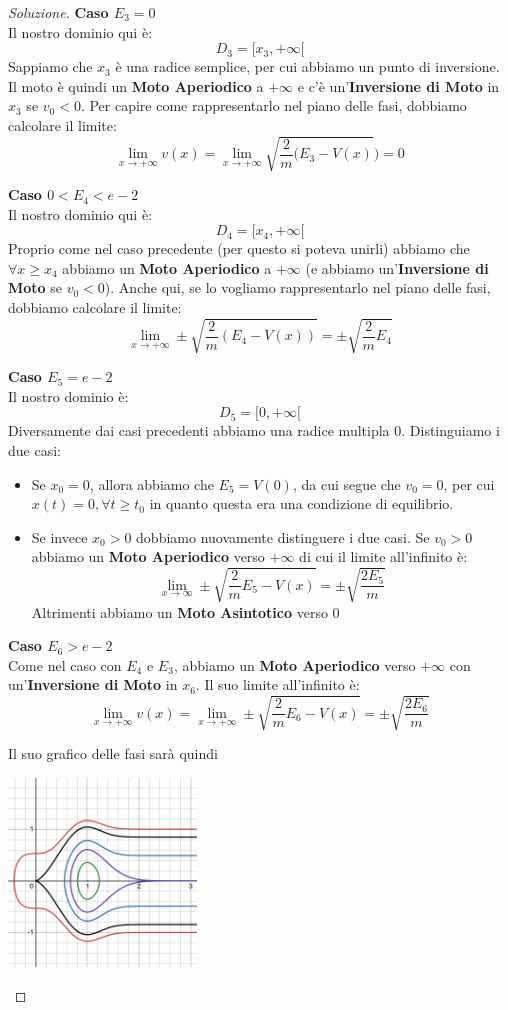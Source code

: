 \documentclass[11pt,a4paper,twoside]{article}
\theoremstyle{definition}
\newenvironment{sol}
	{\renewcommand\qedsymbol{$\blacksquare$}\begin{proof}[Soluzione]}
	{\end{proof}}
\begin{document}
\begin{sol}
	\textbf{Caso $E_3 = 0$}\\
	Il nostro dominio qui è:
	\[ D_3 = [x_3, +\infty[ \]
	Sappiamo che $x_3$ è una radice semplice, per cui abbiamo un punto di inversione. Il moto è quindi un \textbf{Moto Aperiodico} a $+\infty$ e c'è un'\textbf{Inversione di Moto} in $x_3$ se $v_0<0$. Per capire come rappresentarlo nel piano delle fasi, dobbiamo calcolare il limite:
	\[ \lim_{x \to +\infty} v(x)= \lim_{x \to +\infty} \sqrt{\frac{2}{m} (E_3 - V(x)}) = 0 \]

	\textbf{Caso $0<E_4<e-2$}\\
	Il nostro dominio qui è:
	\[ D_4 = [x_4, +\infty[ \]
	Proprio come nel caso precedente (per questo si poteva unirli) abbiamo che $\forall x\geq x_4$ abbiamo un \textbf{Moto Aperiodico} a $+\infty$ (e abbiamo un'\textbf{Inversione di Moto} se $v_0<0$). Anche qui, se lo vogliamo rappresentarlo nel piano delle fasi, dobbiamo calcolare il limite:
	\[ \lim_{x \to +\infty} \pm \sqrt{\frac 2m(E_4 - V(x))} = \pm \sqrt{\frac 2m E_4} \]

	\textbf{Caso $E_5 = e-2$}\\
	Il nostro dominio è:
	\[ D_5 = [0,+\infty[ \]
	Diversamente dai casi precedenti abbiamo una radice multipla $0$. Distinguiamo i due casi:
	\begin{itemize}
		\item Se $x_0 = 0$, allora abbiamo che $E_5 = V(0)$, da cui segue che $v_0 = 0$, per cui $x(t) = 0, \forall t \geq t_0$ in quanto questa era una condizione di equilibrio.
		\item Se invece $x_0>0$ dobbiamo nuovamente distinguere i due casi. Se $v_0>0$ abbiamo un \textbf{Moto Aperiodico} verso $+\infty$ di cui il limite all'infinito è:
			\[ \lim_{x \to \infty}\pm \sqrt{\frac 2m E_5 - V(x)} = \pm \sqrt{\frac{2E_5}{m}} \]
			Altrimenti abbiamo un \textbf{Moto Asintotico} verso $0$
	\end{itemize}

	\textbf{Caso $E_6>e-2$}\\
	Come nel caso con $E_4$ e $E_3$, abbiamo un \textbf{Moto Aperiodico} verso $+ \infty$ con un'\textbf{Inversione di Moto} in $x_6$. Il suo limite all'infinito è:
	\[ \lim_{x \to +\infty} v(x) = \lim_{x \to +\infty}\pm \sqrt{\frac 2m E_6 - V(x)} = \pm \sqrt{\frac{2E_6}{m}} \]

	Il suo grafico delle fasi sarà quindi
	\begin{center}
		\includegraphics[height=5cm]{Grafico5}
	\end{center}
\end{sol}
\end{document}
